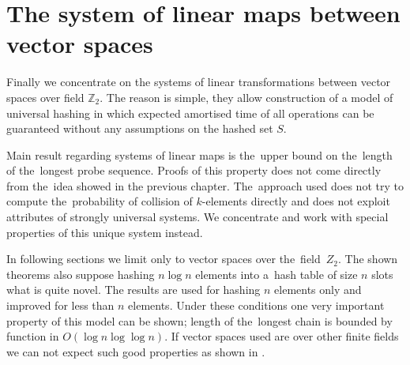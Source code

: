 \chapter{The system of linear maps between vector spaces}
Finally we concentrate on the systems of linear transformations between vector spaces over field $\mathbb{Z}_2$. The reason is simple, they allow construction of a model of universal hashing in which expected amortised time of all operations can be guaranteed without any assumptions on the hashed set $S$. 

Main result regarding systems of linear maps is the~upper bound on the~length of the~longest probe sequence. Proofs of this property does not come directly from the~idea showed in the previous chapter. The~approach used does not try to compute the~probability of collision of $k$-elements directly and does not exploit attributes of strongly universal systems. We concentrate and work with special properties of this unique system instead.

In following sections we limit only to vector spaces over the~field~$Z_2$. The shown theorems also suppose hashing $n \log n$ elements into a~hash table of size $n$ slots what is quite novel. The results are used for hashing $n$ elements only and improved for less than $n$ elements. Under these conditions one very important property of this model can be shown; length of the~longest chain is bounded by function in $O(\log n \log \log n)$. If vector spaces used are over other finite fields we can not expect such good properties as shown in \cite{DBLP:journals/jacm/AlonDMPT99}.





